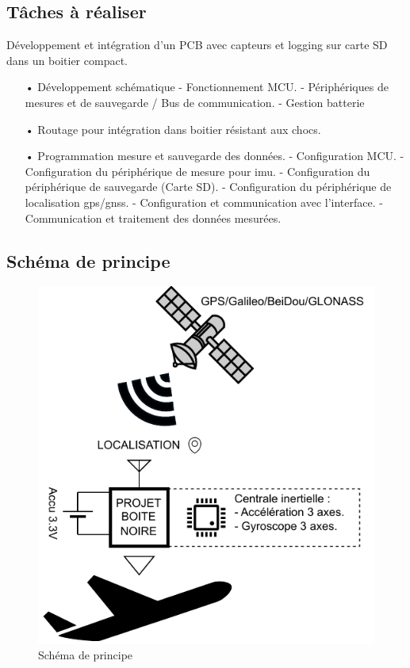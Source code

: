\subsection{Tâches à réaliser}
Développement et intégration d’un PCB avec capteurs et logging sur carte SD dans un boitier compact.
\begin{itemize}
	\item[•] Développement schématique 
	\subitem- Fonctionnement MCU.
	\subitem-	Périphériques de mesures et de sauvegarde / Bus de communication.
	\subitem-	Gestion batterie 
	\item[•]	Routage pour intégration dans boitier résistant aux chocs.
	\item[•]	Programmation mesure et sauvegarde des données.
	\subitem-	Configuration MCU.
	\subitem-	Configuration du périphérique de mesure pour \gls{imu}.
	\subitem-	Configuration du périphérique de sauvegarde (Carte SD).
	\subitem-	Configuration du périphérique de localisation \gls{gps}/\gls{gnss}.
	\subitem-	Configuration et communication avec l'interface.
	\subitem-	Communication et traitement des données mesurées.
\end{itemize}

\subsection{Schéma de principe}
\begin{figure}[h]
	\centering
	\includegraphics[width=0.7\linewidth]{../figures/cdc/schema_principe}
	\caption{Schéma de principe}
	\label{fig:schemaprincipe}
\end{figure}

